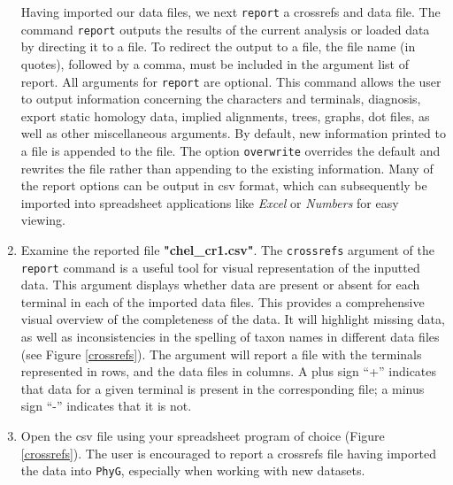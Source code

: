 \documentclass[11pt]{article}
\begin{document}
\begin{enumerate}
Having imported our data files, we next \texttt{report} a crossrefs and data file.
The command \texttt{report} outputs the results of the current analysis or loaded 
data by directing it to a file. To redirect the output to a file, the file name (in quotes), 
followed by a comma, must be included in the argument list of report. All arguments 
for \texttt{report} are optional. This command allows the user to output information 
concerning the characters and terminals, diagnosis, export static homology data, 
implied alignments, trees, graphs, dot files, as well as other miscellaneous arguments. 
By default, new information printed to a file is appended to the file. The option 
\texttt{overwrite} overrides the default and rewrites the file rather than appending 
to the existing information. Many of the report options can be output in csv format, 
which can subsequently be imported into spreadsheet applications like \textit{Excel} 
or \textit{Numbers} for easy viewing. 

\item Examine the reported file \textbf{"chel\_cr1.csv"}. The \texttt{crossrefs} 
argument of the \texttt{report} command is a useful tool for visual representation 
of the inputted data. This argument displays whether data are present or absent 
for each terminal in each of the imported data files. This provides a comprehensive 
visual overview of the completeness of the data. It will highlight missing data, as 
well as inconsistencies in the spelling of taxon names in different data files (see 
Figure \ref{crossrefs}). The argument will report a file with the terminals represented 
in rows, and the data files in columns. A plus sign ``+'' indicates that data for a given 
terminal is present in the corresponding file; a minus sign ``-'' indicates that it is not.

\item Open the csv file using  your spreadsheet program of choice (Figure \ref{crossrefs}). 
The user is encouraged to report a crossrefs file having imported the data 
into \texttt{PhyG}, especially when working with new datasets. 


\end{enumerate}
\end{document}
